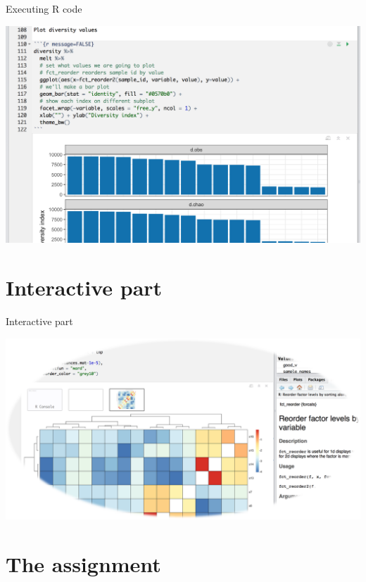 \documentclass[12pt]{beamer}
\begin{document}
\begin{frame}{Executing R code}
\begin{center}
\includegraphics[width=\textwidth]{p9}
\end{center}
\end{frame}

\section{Interactive part}

\begin{frame}{Interactive part}
\begin{center}
\includegraphics[width=\textwidth]{../splash}
\end{center}
\end{frame}

\section{The assignment}
\end{document}
